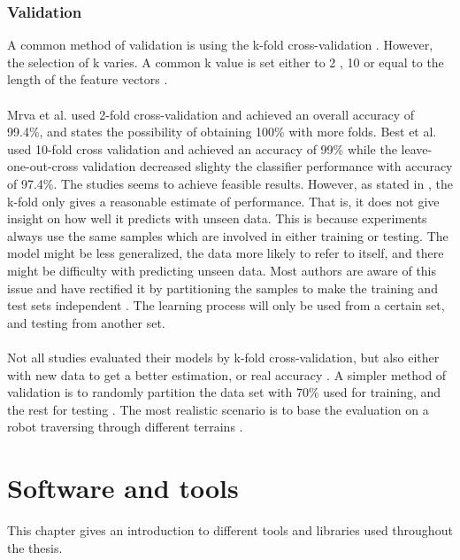 \documentclass[USenglish]{ifimaster}  %
\begin{document}
\subsection{Validation}\label{subseq:validation}
A common method of validation is using the k-fold cross-validation  \cite{DBLP:conf/itat/MrvaF15,6784609,6386243,Hoffmann20141790,6849778,7387710}. However, the selection of k varies. A common k value is set either to 2  \cite{DBLP:conf/itat/MrvaF15,6784609}, 10 \cite{26b23e912c654fe4b7478fd910130195,6386243,Hoffmann20141790,6849778,7387710} or equal to the length of the feature vectors \cite{26b23e912c654fe4b7478fd910130195}.
\\
\\
Mrva et al. \cite{DBLP:conf/itat/MrvaF15} used 2-fold cross-validation and achieved an overall accuracy of 99.4\%, and states the possibility of obtaining 100\% with more folds. Best et al. \cite{26b23e912c654fe4b7478fd910130195} used 10-fold cross validation and achieved an accuracy of 99\% while the leave-one-out-cross validation decreased slighty the classifier performance with accuracy of 97.4\%. The studies seems to achieve feasible results. However, as stated in \cite{7387710}, the k-fold only gives a reasonable estimate of performance. That is, it does not give insight on how well it predicts with unseen data. This is because experiments always use the same samples which are involved in either training or testing. The model might be less generalized, the data  more likely to refer to itself, and there might be difficulty with predicting unseen data. Most authors are aware of this issue and have rectified it by partitioning the samples to make the training and test sets independent \cite{26b23e912c654fe4b7478fd910130195}. The learning process will only be used from a certain set, and testing from another set.
\\
\\
Not all studies evaluated their models by k-fold cross-validation, but also either with new data to get a better estimation, or real accuracy \cite{5509309,Walas2015,5752869}. A simpler method of validation is to randomly partition the data set with 70\% used for training, and the rest for testing \cite{5752869}. The most realistic scenario is to base the evaluation on a robot traversing through different terrains \cite{DBLP:conf/itat/MrvaF15}.

\chapter{Software and tools} \label{chap:software}
This chapter gives an introduction to different tools and libraries used throughout the thesis.
\end{document}

